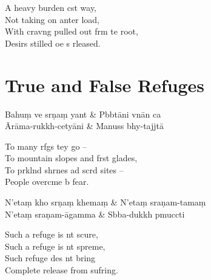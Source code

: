 \begin{english}
  A heavy burden cst way,\\
  Not taking on anter load,\\
  With cravng pulled out frm te root,\\
  Desirs stilled oe s rleased.
\end{english}

\artoptfalse
\chapter{True and False Refuges}%

\begin{leader}
\end{leader}

\begin{twochants}
  Bahuṃ ve srṇaṃ yant & Pbbtāni vnān ca \\
  Ārāma-rukkh-cetyāni & Manuss bhy-tajjtā \\
\end{twochants}

\begin{english}
  To many rfgs tey go --\\
  To mountain slopes and frst glades,\\
  To prklnd shrnes ad scrd sites --\\
  People overcme b fear.
\end{english}

\begin{twochants}
  N'etaṃ kho srṇaṃ khemaṃ & N'etaṃ sraṇam-tamaṃ \\
  N'etaṃ sraṇam-āgamma & Sbba-dukkh pmuccti \\
\end{twochants}

\begin{english}
  Such a refuge is nt scure,\\
  Such a refuge is nt spreme,\\
  Such  refuge des nt bring\\
  Complete release from sufring.
\end{english}

